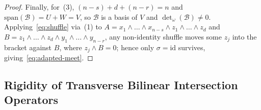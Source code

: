 \documentclass[11pt]{article}
\theoremstyle{definition}
\newcommand{\spn}{\mathrm{span}}
\begin{document}
\begin{proof}
Finally, for~(3), $(n-s) + d + (n-r) = n$ and $\spn(\mathcal{B}) = U + W = V$, so $\mathcal{B}$ is a basis of $V$ and $\det_\omega(\mathcal{B}) \neq 0$. Applying~\eqref{eq:shuffle} via~(1) to $A = x_1 \wedge \dots \wedge x_{n-s} \wedge z_1 \wedge \dots \wedge z_d$ and $B = z_1 \wedge \dots \wedge z_d \wedge y_1 \wedge \dots \wedge y_{n-r}$, any non-identity shuffle moves some $z_j$ into the bracket against $B$, where $z_j \wedge B = 0$; hence only $\sigma = \mathrm{id}$ survives, giving~\eqref{eq:adapted-meet}.
\end{proof}

\subsection{Rigidity of Transverse Bilinear Intersection Operators}
\end{document}
